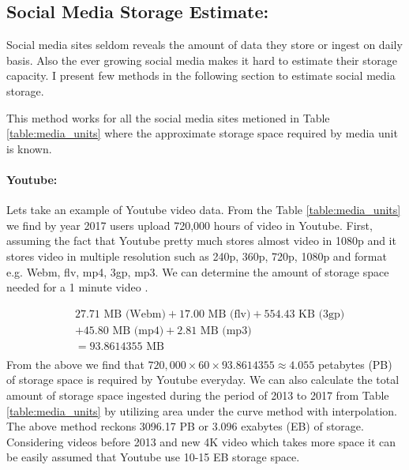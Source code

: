 \subsection*{Social Media Storage Estimate:}
Social media sites seldom reveals the amount of data they store or ingest on daily basis. Also the ever growing social media makes it hard to estimate their storage capacity. I present few methods in the following section to estimate social media storage.

This method works for all the social media sites metioned in Table \ref{table:media_units} where the approximate storage space required by media unit is known.

\paragraph{Youtube:}
Lets take an example of Youtube video data. From the Table  \ref{table:media_units} we find by year 2017 users upload 720,000 hours of video in Youtube. First, assuming the fact that Youtube pretty much stores almost
video in 1080p and it stores video in multiple resolution such as 240p, 360p, 720p, 1080p and format e.g. Webm, flv, mp4, 3gp, mp3. We can determine the amount of storage space needed for a 1 minute video \cite{youtube_stats}.

\begin{equation}
\begin{split}
  &27.71 \text{ MB (Webm)} + 17.00 \text{ MB (flv)} + 554.43 \text{ KB (3gp)} \\
  &+ 45.80 \text{ MB (mp4)} + 2.81 \text{ MB (mp3)}\\
  &= 93.8614355 \text{ MB}\\
  \end{split}
\end{equation}
 From the above we find that $720,000 \times 60 \times 93.8614355 \approx 4.055$ petabytes (PB)  of storage space is required by Youtube everyday. We can also calculate the total amount of storage space ingested during the period of 2013 to 2017 from Table \ref{table:media_units} by utilizing area under the curve method with interpolation. The above method reckons 3096.17 PB or 3.096 exabytes (EB) of storage. Considering videos before 2013 and new 4K video which takes more space it can be easily assumed that Youtube use 10-15 EB storage space.

